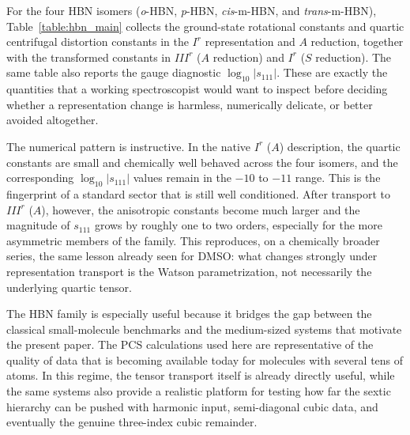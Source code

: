 \documentclass[journal=jacsat,manuscript=article]{achemso}
\begin{document}
For the four HBN isomers (\emph{o}-HBN, \emph{p}-HBN, \emph{cis}-m-HBN, and
\emph{trans}-m-HBN), Table~\ref{table:hbn_main} collects the ground-state
rotational constants and quartic centrifugal distortion constants in the
$I^r$ representation and $A$ reduction, together with the transformed
constants in $III^r$ ($A$ reduction) and $I^r$ ($S$ reduction). The same table
also reports the gauge diagnostic $\log_{10}|s_{111}|$. These are exactly the
quantities that a working spectroscopist would want to inspect before deciding
whether a representation change is harmless, numerically delicate, or better
avoided altogether.

The numerical pattern is instructive. In the native $I^r$ ($A$) description,
the quartic constants are small and chemically well behaved across the four
isomers, and the corresponding $\log_{10}|s_{111}|$ values remain in the
$-10$ to $-11$ range. This is the fingerprint of a standard sector that is
still well conditioned. After transport to $III^r$ ($A$), however, the
anisotropic constants become much larger and the magnitude of $s_{111}$ grows
by roughly one to two orders, especially for the more asymmetric members of
the family. This reproduces, on a chemically broader series, the same lesson
already seen for DMSO: what changes strongly under representation transport is
the Watson parametrization, not necessarily the underlying quartic tensor.

The HBN family is especially useful because it bridges the gap between the
classical small-molecule benchmarks and the medium-sized systems that motivate
the present paper. The PCS calculations used here are representative of the
quality of data that is becoming available today for molecules with several
tens of atoms. In this regime, the tensor transport itself is already directly
useful, while the same systems also provide a realistic platform for testing
how far the sextic hierarchy can be pushed with harmonic input, semi-diagonal
cubic data, and eventually the genuine three-index cubic remainder.
\end{document}
